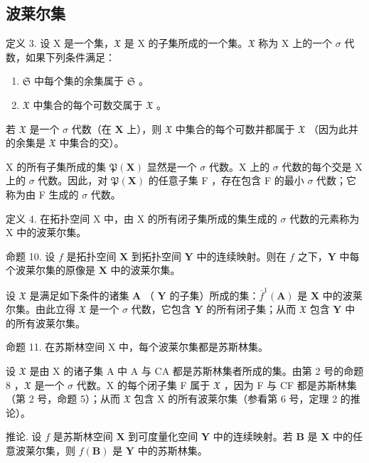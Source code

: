 \subsection{波莱尔集}

定义 3. 设 X 是一个集，\(\mathfrak{X}\) 是 X 的子集所成的一个集。\(\mathfrak{X}\) 称为 X 上的一个 \(\sigma\) 代数，如果下列条件满足：

\begin{enumerate}
\def\labelenumi{\alph{enumi})}
\item
  \(\mathfrak{S}\) 中每个集的余集属于 \(\mathfrak{S}\) 。
\item
  \(\mathfrak{X}\) 中集合的每个可数交属于 \(\mathfrak{X}\) 。
\end{enumerate}

若 \(\mathfrak{X}\) 是一个 \(\sigma\) 代数（在 \(\mathbf{X}\) 上），则 \(\mathfrak{X}\) 中集合的每个可数并都属于 \(\mathfrak{X}\) （因为此并的余集是 \(\mathfrak{X}\) 中集合的交）。

X 的所有子集所成的集 \(\mathfrak{P}(\mathbf{X})\) 显然是一个 \(\sigma\) 代数。X 上的 \(\sigma\) 代数的每个交是 X 上的 \(\sigma\) 代数。因此，对 \(\mathfrak{P}(\mathbf{X})\) 的任意子集 F ，存在包含 F 的最小 \(\sigma\) 代数；它称为由 F 生成的 \(\sigma\) 代数。

定义 4. 在拓扑空间 X 中，由 X 的所有闭子集所成的集生成的 \(\sigma\) 代数的元素称为 X 中的波莱尔集。

命题 10. 设 \(f\) 是拓扑空间 \(\mathbf{X}\) 到拓扑空间 \(\mathbf{Y}\) 中的连续映射。则在 \(f\) 之下，\(\mathbf{Y}\) 中每个波莱尔集的原像是 \(\mathbf{X}\) 中的波莱尔集。

设 \(\mathfrak{X}\) 是满足如下条件的诸集 \(\mathbf{A}\) （ \(\mathbf{Y}\) 的子集）所成的集：\(\overline{f}^1 (\mathbf{A})\) 是 \(\mathbf{X}\) 中的波莱尔集。由此立得 \(\mathfrak{X}\) 是一个 \(\sigma\) 代数，它包含 \(\mathbf{Y}\) 的所有闭子集；从而 \(\mathfrak{X}\) 包含 \(\mathbf{Y}\) 中的所有波莱尔集。

命题 11. 在苏斯林空间 X 中，每个波莱尔集都是苏斯林集。

设 \(\mathfrak{X}\) 是由 X 的诸子集 A 中 A 与 CA 都是苏斯林集者所成的集。由第 2 号的命题 8 ，\(\mathfrak{X}\) 是一个 \(\sigma\) 代数。X 的每个闭子集 F 属于 \(\mathfrak{X}\) ，因为 F 与 CF 都是苏斯林集（第 2 号，命题 5）；从而 \(\mathfrak{X}\) 包含 X 的所有波莱尔集（参看第 6 号，定理 2 的推论）。

推论. 设 \(f\) 是苏斯林空间 \(\mathbf{X}\) 到可度量化空间 \(\mathbf{Y}\) 中的连续映射。若 \(\mathbf{B}\) 是 \(\mathbf{X}\) 中的任意波莱尔集，则 \(f(\mathbf{B})\) 是 \(\mathbf{Y}\) 中的苏斯林集。

